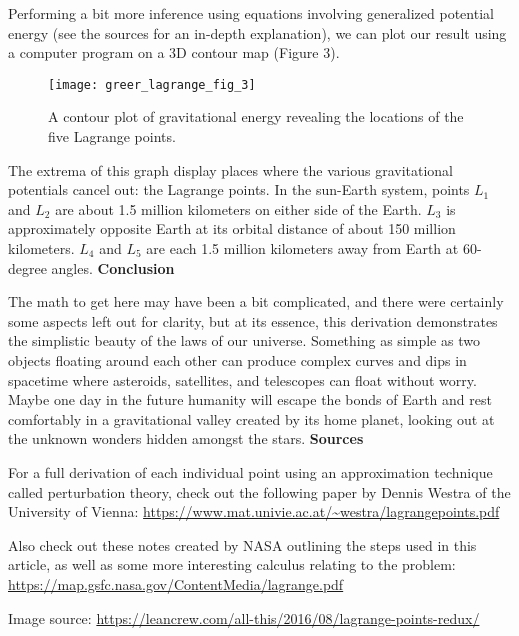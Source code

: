 Performing a bit more inference using equations involving generalized potential energy (see the sources for an in-depth explanation), we can plot our result using a computer program on a 3D contour map (Figure 3).

\begin{figure}[h]
  \begin{center}
    \texttt{[image: greer\_lagrange\_fig\_3]}
  \end{center}
  \caption{A contour plot of gravitational energy revealing the locations of the five Lagrange points.}
  \label{fig:3}
\end{figure}

The extrema of this graph display places where the various gravitational potentials cancel out: the Lagrange points. In the sun-Earth system, points $L_1$ and $L_2$ are about 1.5 million kilometers on either side of the Earth. $L_3$ is approximately opposite Earth at its orbital distance of about 150 million kilometers. $L_4$ and $L_5$ are each 1.5 million kilometers away from Earth at 60-degree angles.
\newline\newline
\textbf{Conclusion}

The math to get here may have been a bit complicated, and there were certainly some aspects left out for clarity, but at its essence, this derivation demonstrates the simplistic beauty of the laws of our universe. Something as simple as two objects floating around each other can produce complex curves and dips in spacetime where asteroids, satellites, and telescopes can float without worry. Maybe one day in the future humanity will escape the bonds of Earth and rest comfortably in a gravitational valley created by its home planet, looking out at the unknown wonders hidden amongst the stars. 
\newline\newline
\textbf{Sources}

For a full derivation of each individual point using an approximation technique called perturbation theory, check out the following paper by Dennis Westra of the University of Vienna: 
\newline\url{https://www.mat.univie.ac.at/~westra/lagrangepoints.pdf}

Also check out these notes created by NASA outlining the steps used in this article, as well as some more interesting calculus relating to the problem:
\newline\url{https://map.gsfc.nasa.gov/ContentMedia/lagrange.pdf}

Image source: 
\newline\url{https://leancrew.com/all-this/2016/08/lagrange-points-redux/}